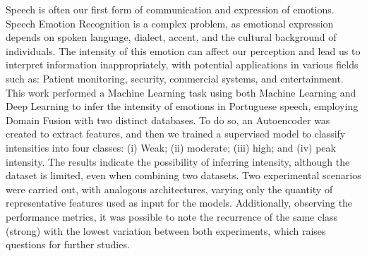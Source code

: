 Speech is often our first form of communication and expression of emotions. Speech Emotion Recognition is a complex problem, as emotional expression depends on spoken language, dialect, accent, and the cultural background of individuals. The intensity of this emotion can affect our perception and lead us to interpret information inappropriately, with potential applications in various fields such as: Patient monitoring, security, commercial systems, and entertainment. This work performed a Machine Learning task using both Machine Learning and Deep Learning to infer the intensity of emotions in Portuguese speech, employing Domain Fusion with two distinct databases. To do so, an Autoencoder was created to extract features, and then we trained a supervised model to classify intensities into four classes: (i) Weak; (ii) moderate; (iii) high; and (iv) peak intensity. The results indicate the possibility of inferring intensity, although the dataset is limited, even when combining two datasets. Two experimental scenarios were carried out, with analogous architectures, varying only the quantity of representative features used as input for the models. Additionally, observing the performance metrics, it was possible to note the recurrence of the same class (strong) with the lowest variation between both experiments, which raises questions for further studies.